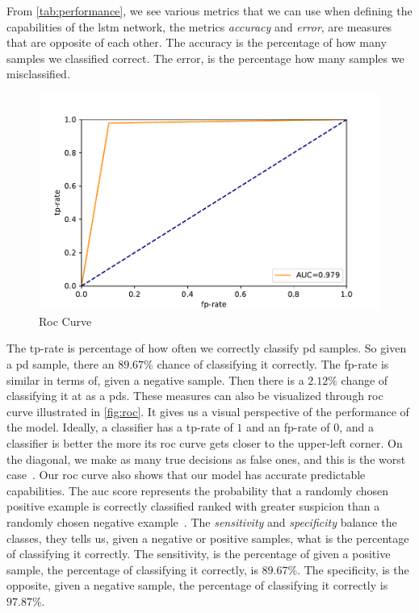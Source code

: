 

From \autoref{tab:performance}, we see various metrics that we can use when defining the capabilities of the \ac{lstm} network, the metrics \emph{accuracy} and \emph{error}, are measures that are opposite of each other. The accuracy is the percentage of how many samples we classified correct. The error, is the percentage how many samples we misclassified.

\begin{figure}[ht]
    \centering
    \includegraphics[width=\textwidth]{results/roc.pdf}
    \caption[\project's \acf{roc} curve]{Roc Curve}
    \label{fig:roc}
\end{figure} 

The tp-rate is percentage of how often we correctly classify \ac{pd} samples. So given a \ac{pd} sample, there an $89.67\%$ chance of classifying it correctly. The fp-rate is similar in terms of, given a negative sample. Then there is a $2.12\%$ change of classifying it at as a \acp{pd}. These measures can also be visualized through \ac{roc} curve illustrated in \autoref{fig:roc}. It gives us a visual perspective of the performance of the model. Ideally, a classifier has a tp-rate of $1$ and an fp-rate of $0$, and a classifier is better the more its \ac{roc} curve gets closer to the upper-left corner. On the diagonal, we make as many true decisions as false ones, and this is the worst case~\cite[p.~563]{alpaydin2014introduction}. Our \ac{roc} curve also shows that our model has accurate predictable capabilities. The \ac{auc} score represents the probability that a randomly chosen positive example is correctly classified ranked with greater suspicion than a randomly chosen negative example~\cite{bradley1997use}.
The \emph{sensitivity} and \emph{specificity} balance the classes, they tells us, given a negative or positive samples, what is the percentage of classifying it correctly. The sensitivity, is the percentage of given a positive sample, the percentage of classifying it correctly, is $89.67\%$. The specificity, is the opposite, given a negative sample, the percentage of classifying it correctly is $97.87\%$. 

